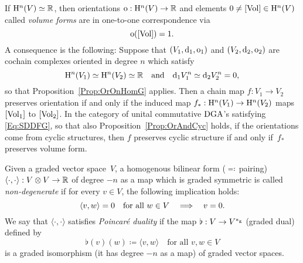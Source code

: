 \documentclass[\MainFolder/Text.tex]{subfiles}
\begin{document}
\begin{Remark}\label{Rem:VolForms}
If $\mathrm{H}^n(V) \simeq \mathbb{R}$, then orientations $\mathrm{o}: \mathrm{H}^n(V)\rightarrow\mathbb{R}$  and elements $0\neq [\mathrm{Vol}] \in \mathrm{H}^n(V)$ called \emph{volume forms} are in one-to-one correspondence via
\[ \mathrm{o}([\mathrm{Vol}]) = 1. \]
A consequence is the following:
Suppose that $(V_1,\mathrm{d}_1,\mathrm{o}_1)$ and $(V_2,\mathrm{d}_2,\mathrm{o}_2)$ are cochain complexes oriented in degree $n$ which satisfy 
\begin{equation}\label{Eq:SDDFG}
\mathrm{H}^n(V_1)\simeq\mathrm{H}^n(V_2)\simeq\mathbb{R}\quad\text{and}\quad\mathrm{d}_1 V_1^n \simeq \mathrm{d}_2 V_2^n = 0,
\end{equation}
so that Proposition~\ref{Prop:OrOnHomG} applies. Then a chain map $f: V_1 \rightarrow V_2$ preserves orientation if and only if the induced map $f_*: \mathrm{H}^n(V_1) \rightarrow \mathrm{H}^n(V_2)$ maps $[\mathrm{Vol}_1]$ to $[\mathrm{Vol}_2]$. In the category of unital commutative $\mathrm{DGA}$'s satisfying \eqref{Eq:SDDFG}, so that also Proposition~\ref{Prop:OrAndCyc} holds, if the orientations come from cyclic structures, then $f$ preserves cyclic structure if and only if~$f_*$ preserves volume form.
\end{Remark}



\begin{Definition}\label{Def:PoincDual}
Given a graded vector space~$V$, a homogenous bilinear form ($\eqqcolon$\,pairing) $\langle\cdot,\cdot\rangle: V\otimes V \rightarrow \mathbb{R}$ of degree $-n$ as a map which is graded symmetric is called \emph{non-degenerate} if for every $v\in V$, the following implication holds:
\[ \langle v,w \rangle= 0\quad\text{for all }w\in V\quad\Longrightarrow\quad v=0. \]
We say that $\langle\cdot,\cdot\rangle$ satisfies \emph{Poincar\'e duality} if the map $\flat: V \rightarrow V^{*_{\mathrm{g}}}$ (graded dual) defined by 
\[\flat(v)(w) \coloneqq \langle v,w\rangle\quad \text{for all }v,w\in V\]
is a graded isomorphism (it has degree $-n$ as a map) of graded vector spaces.
\end{Definition}
\end{document}
